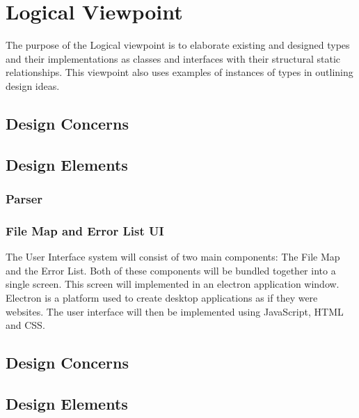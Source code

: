 \documentclass[letterpaper,10pt,titlepage,draftclsnofoot,onecolumn,onesided] {IEEEtran}
\begin{document}
	
	
\section{Logical Viewpoint}
The purpose of the Logical viewpoint is to elaborate existing and designed types and their implementations
as classes and interfaces with their structural static relationships. This viewpoint also uses examples of
instances of types in outlining design ideas. 
\subsection{Design Concerns}
\subsection{Design Elements}

	\subsubsection{Parser}

	\subsubsection{File Map and Error List UI}
	The User Interface system will consist of two main components: The File Map and the Error List. 
	Both of these components will be bundled together into a single screen. 
	This screen will implemented in an electron application window. 
	Electron is a platform used to create desktop applications as if they were websites.
	The user interface will then be implemented using JavaScript, HTML and CSS.
	\subsection{Design Concerns}
	\subsection{Design Elements}
\end{document}
